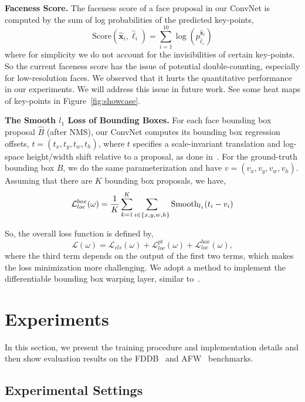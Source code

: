 \documentclass[runningheads]{llncs}
\begin{document}
\textbf{Faceness Score.} The faceness score of a face proposal in our ConvNet is computed by the sum of log probabilities of the predicted key-points,
\begin{equation}
    \text{Score}(\hat{\mathbf{x}}_i, \hat{\ell}_i) = \sum_{i=1}^{10} \log (p_{\hat{\ell}_i}^{\hat{\mathbf{x}}_i})
    \label{eqn:Faceness}
\end{equation}
where for simplicity we do not account for the invisibilities of certain key-points. So the current faceness score has the issue of potential double-counting, especially for low-resolution faces. We observed that it hurts the quantitative performance in our experiments. We will address this issue in future work. See some heat maps of key-points in Figure~\ref{fig:showcase}.

\textbf{The Smooth $l_1$ Loss of Bounding Boxes.} For each face bounding box proposal $\hat{B}$ (after NMS), our ConvNet computes its bounding box regression offsets, $t=(t_x, t_y, t_w, t_h)$, where $t$ specifies a scale-invariant translation and log-space height/width shift relative to a proposal, as done in~\cite{FastRCNN,FasterRCNN}. For the ground-truth bounding box $B$, we do the same parameterization and have $v=(v_x, v_y, v_w, v_h)$. Assuming that there are $K$ bounding box proposals, we have,
\begin{align}
\mathcal{L}_{loc}^{box}(\omega) = {1\over K}\sum_{k=1}^K \sum_{\substack{ i\in \{x, y, w, h\}}} \text{Smooth}_{l_1}(t_i-v_i)
\end{align}

So, the overall loss function is defined by,
\begin{equation}
\mathcal{L}(\omega) = \mathcal{L}_{cls}(\omega) + \mathcal{L}_{loc}^{pt}(\omega) + \mathcal{L}_{loc}^{box}(\omega),
\end{equation}
where the third term depends on the output of the first two terms, which makes the loss minimization more challenging.
We adopt a method to implement the differentiable bounding box warping layer, similar to~\cite{ResidualNetSeg}.

\section{Experiments} \label{sec:exp}

In this section, we present the training procedure and implementation details and then show evaluation results on the  FDDB~\cite{FDDB} and AFW~\cite{AFW} benchmarks.

\subsection{Experimental Settings}
\end{document}
